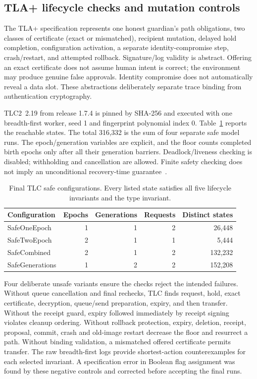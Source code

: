 \documentclass[pdflatex,sn-mathphys-num]{sn-jnl}
\theoremstyle{plain}
\theoremstyle{definition}
\begin{document}
\subsection{TLA+ lifecycle checks and mutation controls}\label{sec:tlc}
The TLA+ specification represents one honest guardian's path obligations, two classes of certificate (exact or mismatched), recipient mutation, delayed hold completion, configuration activation, a separate identity-compromise step, crash/restart, and attempted rollback. Signature/log validity is abstract. Offering an exact certificate does not assume human intent is correct; the environment may produce genuine false approvals. Identity compromise does not automatically reveal a data slot. These abstractions deliberately separate trace binding from authentication cryptography.

TLC2~2.19 from release 1.7.4 is pinned by SHA-256 and executed with one breadth-first worker, seed 1 and fingerprint polynomial index 0. Table~\ref{tab:tlc} reports the reachable states. The total 316,332 is the sum of four separate safe model runs. The epoch/generation variables are explicit, and the floor counts completed birth epochs only after all their generation barriers. Deadlock/liveness checking is disabled; withholding and cancellation are allowed. Finite safety checking does not imply an unconditional recovery-time guarantee~\cite{lamport2002}.

\begin{table}[htbp]
\caption{Final TLC safe configurations. Every listed state satisfies all five lifecycle invariants and the type invariant.}\label{tab:tlc}
\centering\small
\begin{tabular}{@{}lrrrr@{}}\toprule
Configuration & Epochs & Generations & Requests & Distinct states\\\midrule
SafeOneEpoch&1&1&2&26,448\\
SafeTwoEpoch&2&1&1&5,444\\
SafeCombined&2&1&2&132,232\\
SafeGenerations&1&2&2&152,208\\\bottomrule
\end{tabular}
\end{table}

Four deliberate unsafe variants ensure the checks reject the intended failures. Without queue cancellation and final rechecks, TLC finds request, hold, exact certificate, decryption, queue/send preparation, expiry, and then transfer. Without the receipt guard, expiry followed immediately by receipt signing violates cleanup ordering. Without rollback protection, expiry, deletion, receipt, proposal, commit, crash and old-image restart decrease the floor and resurrect a path. Without binding validation, a mismatched offered certificate permits transfer. The raw breadth-first logs provide shortest-action counterexamples for each selected invariant. A specification error in Boolean flag assignment was found by these negative controls and corrected before accepting the final runs.
\end{document}
